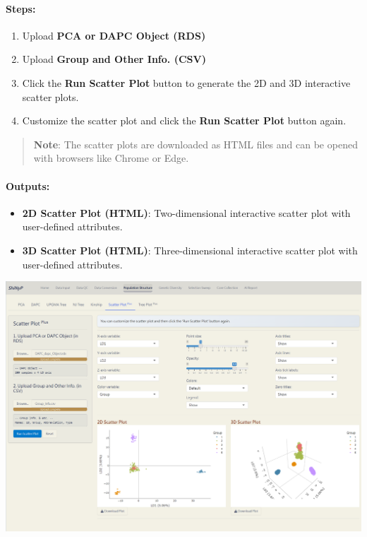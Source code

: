 \documentclass[
]{book}
\begin{document}
\paragraph*{}\label{section}

\paragraph*{\texorpdfstring{\textbf{Steps:}}{Steps:}}\label{steps-3}

\begin{enumerate}
\def\labelenumi{\arabic{enumi}.}
\item
  {Upload} \textbf{PCA or DAPC Object (RDS)}
\item
  {Upload} \textbf{Group and Other Info. (CSV)}
\item
  Click the {\textbf{Run Scatter Plot}} button to generate the 2D and 3D interactive scatter plots.
\item
  Customize the scatter plot and click the {\textbf{Run Scatter Plot}} button again.
\end{enumerate}

\begin{quote}
\textbf{Note}: The scatter plots are downloaded as HTML files and can be opened with browsers like Chrome or Edge.
\end{quote}

\paragraph*{Outputs:}\label{outputs-10}

\begin{itemize}
\item
  \textbf{2D Scatter Plot (HTML)}: Two-dimensional interactive scatter plot with user-defined attributes.
\item
  \textbf{3D Scatter Plot (HTML)}: Three-dimensional interactive scatter plot with user-defined attributes.
\end{itemize}

\includegraphics{images/clipboard-1525634301.png}
\end{document}
